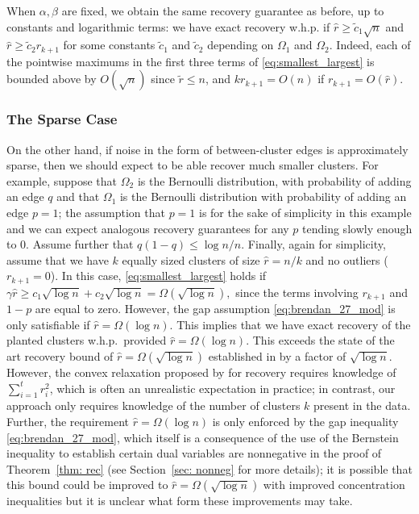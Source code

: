 \documentclass[twoside,11pt]{article}
\newcommand{\0}{\bs{0}}
\newcommand{\ra}{\rightarrow}
\begin{document}
{When \( \alpha, \beta \) are fixed, we obtain the same recovery guarantee as before, up to constants and logarithmic
terms:  we have exact recovery w.h.p.
if \(\hat r \ge \tilde c_1 \sqrt{n} \) and \(\hat r \ge \tilde c_2 r_{k+1} \)
for some constants \(\tilde c_1\) and \(\tilde c_2\) depending on \(\Omega_1\) and \(\Omega_2\).
Indeed, each of the pointwise maximums in the first  three terms
of \eqref{eq:smallest_largest} is bounded above by $O(\sqrt{n})$
since $\tilde r \le n$, and $k r_{k+1} = O(n)$ if $r_{k+1} = O(\hat r)$.

\subsubsection{The Sparse Case}


On the other hand, if noise in the form of between-cluster
edges is  approximately sparse, then we
should expect to be able recover
much smaller clusters.
For example, suppose that \(\Omega_2\) is the Bernoulli distribution, with probability of adding an edge \(q\) and that \(\Omega_1\) is the Bernoulli distribution with probability of adding an edge \(p=1\); the assumption that \(p=1\) is for the sake of simplicity in this example and we can expect analogous recovery guarantees for
any \(p\) tending slowly enough to \(0\).
Assume further that
\(
q (1-q)  \le {\log n }/{n}.
\)
Finally, again for simplicity, assume that we have \(k\) equally sized clusters of size \(\hat r = n/k\)
and no outliers (\(r_{k+1} = 0\)).
In this case, \eqref{eq:smallest_largest}
holds if
$
\gamma \hat r \ge c_1 \sqrt{\log n} + c_2 \sqrt{\log n}
= \Omega(\sqrt{\log n} ),
$
since the terms involving \(r_{k+1}\) and \(1-p\) are equal to zero.
However, the gap assumption \eqref{eq:brendan_27_mod} is only
satisfiable if $\hat r = \Omega(\log n)$.
This implies that we have exact recovery of the planted clusters
w.h.p.~provided $\hat r =\Omega(\log n)$. This exceeds the
state of the art recovery bound
of $\hat r = \Omega(\sqrt{\log n})$ established in \cite{jalali2015relative}
by a factor of $\sqrt{\log n}$.
However, the convex relaxation proposed by
\cite{jalali2015relative} for recovery requires knowledge
of $\sum_{i=1}^t r_i^2$, which is often an unrealistic
expectation in practice;
in contrast, our approach only requires knowledge
of the number of clusters $k$ present in the data.
Further,  the requirement $\hat r = \Omega(\log n)$
is only enforced by the gap inequality \eqref{eq:brendan_27_mod},
which itself is a consequence of the use of the Bernstein inequality
to establish certain dual variables are nonnegative
in the proof of Theorem~\ref{thm: rec} (see Section~\ref{sec: nonneg}
for more details); it is possible that this bound could be improved
to $\hat r = \Omega(\sqrt{\log n})$ with improved concentration
inequalities
 but it is unclear
what form these improvements may take.


}
\end{document}
